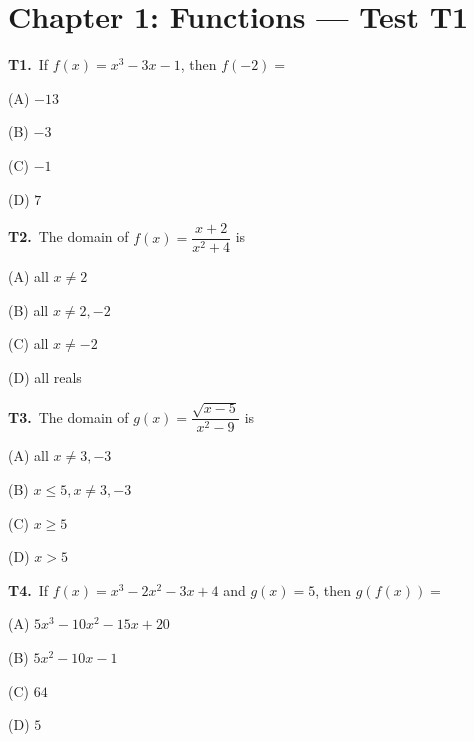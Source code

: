 \documentclass[11pt]{article}
\begin{document}
\section*{Chapter 1: Functions --- Test T1}

\bigskip\noindent\textbf{T1.}\ If $f(x) = x^3 - 3x - 1$, then $f(-2) =$
\begin{list}{}{\setlength{\leftmargin}{3em}\setlength{\labelwidth}{2.5em}\setlength{\itemsep}{0pt}\setlength{\topsep}{2pt}}
\item[(A)] $-13$
\item[(B)] $-3$
\item[(C)] $-1$
\item[(D)] $7$
\end{list}

\bigskip\noindent\textbf{T2.}\ The domain of $f(x) = \dfrac{x+2}{x^2+4}$ is
\begin{list}{}{\setlength{\leftmargin}{3em}\setlength{\labelwidth}{2.5em}\setlength{\itemsep}{0pt}\setlength{\topsep}{2pt}}
\item[(A)] all $x \neq 2$
\item[(B)] all $x \neq 2, -2$
\item[(C)] all $x \neq -2$
\item[(D)] all reals
\end{list}

\bigskip\noindent\textbf{T3.}\ The domain of $g(x) = \dfrac{\sqrt{x-5}}{x^2-9}$ is
\begin{list}{}{\setlength{\leftmargin}{3em}\setlength{\labelwidth}{2.5em}\setlength{\itemsep}{0pt}\setlength{\topsep}{2pt}}
\item[(A)] all $x \neq 3, -3$
\item[(B)] $x \leq 5, x \neq 3, -3$
\item[(C)] $x \geq 5$
\item[(D)] $x > 5$
\end{list}

\bigskip\noindent\textbf{T4.}\ If $f(x) = x^3 - 2x^2 - 3x + 4$ and $g(x) = 5$, then $g(f(x)) =$
\begin{list}{}{\setlength{\leftmargin}{3em}\setlength{\labelwidth}{2.5em}\setlength{\itemsep}{0pt}\setlength{\topsep}{2pt}}
\item[(A)] $5x^3 - 10x^2 - 15x + 20$
\item[(B)] $5x^2 - 10x - 1$
\item[(C)] $64$
\item[(D)] $5$
\end{list}
\end{document}
